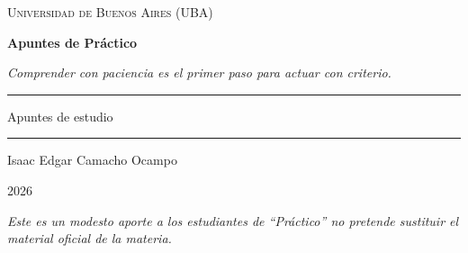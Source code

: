\documentclass[12pt,oneside]{book}
\newcommand{\universidad}{Universidad de Buenos Aires (UBA)}
\newcommand{\materia}{Práctico}
\newcommand{\titulo}{Apuntes de Práctico}
\newcommand{\autor}{Isaac Edgar Camacho Ocampo}
\newcommand{\anio}{2026}
\begin{document}
\begin{titlepage}

\thispagestyle{empty}

\begin{center}

\vspace*{1cm}

{\large \textsc{\universidad}}

\vspace{5cm}

{\Huge \textbf{\titulo}}

\vspace{1cm}

\textit{Comprender con paciencia es el primer paso para actuar con criterio.}

\vspace{1.2cm}

\rule{0.70\textwidth}{0.5pt}

\vspace{0.5cm}

{\large Apuntes de estudio}

\vspace{0.5cm}

\rule{0.70\textwidth}{0.5pt}

\vfill

{\large \autor}

\vspace{0.3cm}

{\large \anio}

\end{center}

\vfill

\begin{flushleft}
\textit{Este es un modesto aporte a los estudiantes de ``\materia'' no pretende sustituir el material oficial de la materia.}
\end{flushleft}

\end{titlepage}

\tableofcontents
\clearpage


\end{document}
